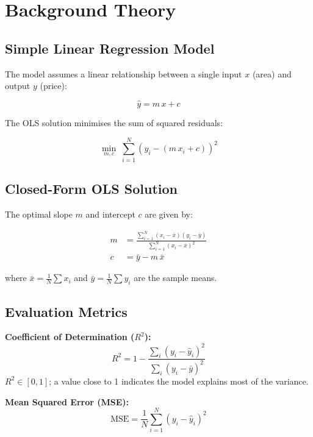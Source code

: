 \documentclass[12pt,a4paper]{article}
\begin{document}
\section{Background Theory}

\subsection{Simple Linear Regression Model}

The model assumes a linear relationship between a single input $x$ (area) and output $y$ (price):

\begin{equation}
  \hat{y} = m\,x + c
  \label{eq:slr}
\end{equation}

The OLS solution minimises the sum of squared residuals:

\begin{equation}
  \min_{m,c}\; \sum_{i=1}^{N}\!\left(y_i - (m\,x_i + c)\right)^2
  \label{eq:ols}
\end{equation}

\subsection{Closed-Form OLS Solution}

The optimal slope $m$ and intercept $c$ are given by:

\begin{align}
  m &= \frac{\sum_{i=1}^{N}(x_i - \bar{x})(y_i - \bar{y})}{\sum_{i=1}^{N}(x_i - \bar{x})^2}
  \label{eq:slope} \\[6pt]
  c &= \bar{y} - m\,\bar{x}
  \label{eq:intercept}
\end{align}

where $\bar{x} = \frac{1}{N}\sum x_i$ and $\bar{y} = \frac{1}{N}\sum y_i$ are the sample means.

\subsection{Evaluation Metrics}

\textbf{Coefficient of Determination ($R^2$):}
\begin{equation}
  R^2 = 1 - \frac{\sum_i (y_i - \hat{y}_i)^2}{\sum_i (y_i - \bar{y})^2}
  \label{eq:r2}
\end{equation}
$R^2 \in [0,1]$; a value close to 1 indicates the model explains most of the variance.

\textbf{Mean Squared Error (MSE):}
\begin{equation}
  \text{MSE} = \frac{1}{N}\sum_{i=1}^{N}(y_i - \hat{y}_i)^2
\end{equation}
\end{document}
